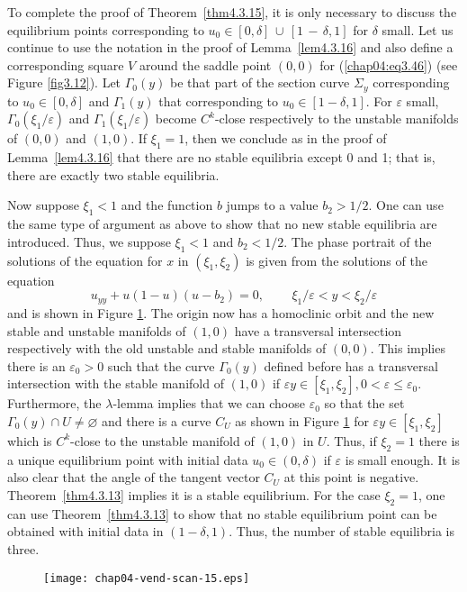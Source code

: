 \documentclass{surv-l}
\theoremstyle{plain}
\theoremstyle{definition}
\numberwithin{equation}{section}
\numberwithin{figure}{chapter}
\begin{document}
To complete the proof of Theorem~\ref{thm4.3.15}, it is only necessary to discuss the equilibrium points corresponding to $u_{0}\in[0,\delta]\,\cup\,[1\,-\,\delta,1]$ for $\delta$ small. Let us continue to use the notation in the proof of Lemma~\ref{lem4.3.16} and also define a corresponding square $V$ around the saddle point $(0,0)$ for (\ref{chap04:eq3.46}) (see Figure \ref{fig3.12}). Let $\Gamma_{0}(y)$ be that part of the section curve $\Sigma_{y}$ corresponding to $u_{0}\in[0,\delta]$ and $\Gamma_{1}(y)$ that corresponding to $u_{0}\in[1-\delta,1]$. For $\varepsilon$ small, $\Gamma_{0}(\xi_{1}/\varepsilon)$ and $\Gamma_{1}(\xi_{1}/\varepsilon)$ become $C^{k}$-close respectively to the unstable manifolds of $(0,0)$ and $(1,0)$. If $\xi_{1}=1$, then we conclude as in the proof of Lemma~\ref{lem4.3.16} that there are no stable equilibria except $0$ and 1; that is, there are exactly two stable equilibria.

Now suppose $\xi_{1}<1$ and the function $b$ jumps to a value $b_{2}>1/2$. One can use the same type of argument as above to show that no new stable equilibria are introduced. Thus, we suppose $\xi_{1}<1$ and $b_{2}<1/2$. The phase portrait of the solutions of the equation for $x$ in $(\xi_{1}, \xi_{2})$ is given from the solutions of the equation
\begin{equation}\label{chap04:eq3.47}
u_{yy}+u(1-u)(u-b_{2})=0,\qquad\, \xi_{1}/\varepsilon<y<\xi_{2}/\varepsilon
\end{equation}
and is shown in Figure \ref{fig3.13}. The origin now has a homoclinic orbit and the new stable and unstable manifolds of $(1, 0)$ have a transversal intersection respectively with the old unstable and stable manifolds of $(0,0)$. This implies there is an $\varepsilon_{0}>0$ such that the curve $\Gamma_{0}(y)$ defined before has a transversal intersection with the stable manifold of $(1, 0)$ if $\varepsilon y\in[\xi_{1},\xi_{2}],0<\varepsilon \leq\varepsilon_{0}$. Furthermore, the $\lambda$-lemma implies that we can choose $\varepsilon_{0}$ so that the set $\Gamma_{0}(y)\cap U\neq\varnothing$ and there is a curve $C_{U}$ as shown in Figure \ref{fig3.13} for $\varepsilon y\in[\xi_{1}, \xi_{2}]$ which is $C^{k}$-close to the unstable manifold of $(1, 0)$ in $U$. Thus, if $\xi_{2}=1$ there is a unique equilibrium point with initial data $u_{0}\in(0, \delta)$ if $\varepsilon$ is small enough. It is also clear that the angle of the tangent vector $C_{U}$ at this point is negative. Theorem~\ref{thm4.3.13} implies it is a stable equilibrium. For the case $\xi_{2}=1$, one can use Theorem~\ref{thm4.3.13} to show that no stable equilibrium point can be obtained with initial data in $(1-\delta, 1)$. Thus, the number of stable equilibria is three.
\begin{figure}
\texttt{[image: chap04-vend-scan-15.eps]}
\caption{}\label{fig3.13}
\end{figure}
\end{document}
